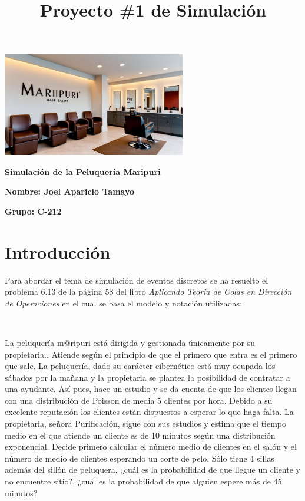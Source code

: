 \documentclass{article}
\title{Proyecto \#1 de Simulación}
\author{}
\date{}
\begin{document}
\maketitle

\begin{center}
    \includegraphics[width=0.6\textwidth]{../images/maripuri.jpg}
\end{center}

\vspace{0.5cm}
\begin{center}
    \Large\textbf{Simulación de la Peluquería Maripuri}
\end{center}

\vspace{8cm}
\large\textbf{Nombre: Joel Aparicio Tamayo}

\large\textbf{Grupo: C-212}

\newpage

\section{Introducción}
Para abordar el tema de simulación de eventos discretos se ha resuelto el 
problema 6.13 de la página 58 del libro \textit{Aplicando Teoría de Colas 
en Dirección de Operaciones} en el cual se basa el modelo y notación utilizadas:

\ 

La peluquería m@ripuri está dirigida y gestionada únicamente por su 
propietaria.. Atiende según el principio de que el primero que entra es el primero 
que sale. La peluquería, dado su carácter cibernético está muy ocupada los 
sábados por la mañana y la propietaria se plantea la posibilidad de contratar a una 
ayudante. Así pues, hace un estudio y se da cuenta de que los clientes llegan con 
una distribución de Poisson de media 5 clientes por hora. Debido a su excelente 
reputación los clientes están dispuestos a esperar lo que haga falta. La propietaria, 
señora Purificación, sigue con sus estudios y estima que el tiempo medio en el que 
atiende un cliente es de 10 minutos según una distribución exponencial. Decide 
primero calcular el número medio de clientes en el salón y el número de medio de 
clientes esperando un corte de pelo. Sólo tiene 4 sillas además del sillón de 
peluquera, ¿cuál es la probabilidad de que llegue un cliente y no encuentre sitio?, 
¿cuál es la probabilidad de que alguien espere más de 45 minutos?
\end{document}
